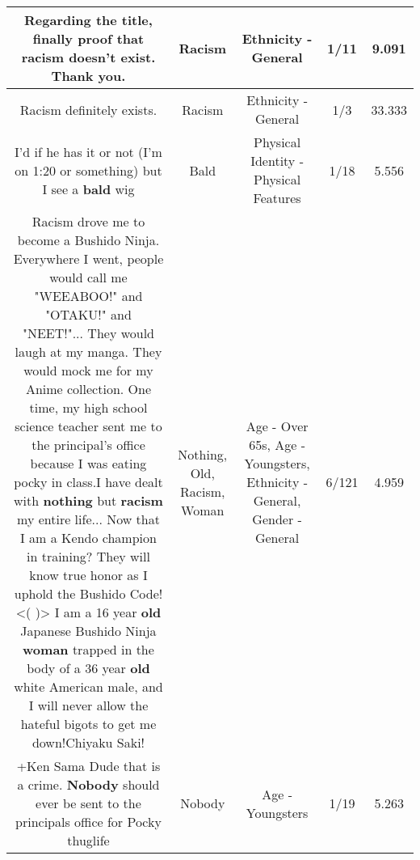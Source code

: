 \documentclass[11pt]{article}
\newlength\mylength
\begin{document}
\begin{center}
\begin{longtable}{|C{.65\mylength}|C{.30\mylength}|C{.12\mylength}|C{.12\mylength}|C{.12\mylength}|}
  \small Regarding the title, finally proof that \textbf{racism} doesn't exist. Thank you.\normalsize   & Racism & Ethnicity - General & 1/11 & 9.091 \\  \hline
  \small Racism definitely exists.\normalsize   & Racism & Ethnicity - General & 1/3 & 33.333 \\  \hline
  \small I'd if he has it or not (I'm on 1:20 or something) but I see a \textbf{bald} wig\normalsize   & Bald & Physical Identity - Physical Features & 1/18 & 5.556 \\  \hline
  \small Racism drove me to become a Bushido Ninja. Everywhere I went, people would call me "WEEABOO!" and "OTAKU!" and "NEET!"... They would laugh at my manga. They would mock me for my Anime collection. One time, my high school science teacher sent me to the principal's office because I was eating pocky in class.I have dealt with \textbf{nothing} but \textbf{racism} my entire life... Now that I am a Kendo champion in training? They will know true honor as I uphold the Bushido Code!<(   )> I am a 16 year \textbf{old} Japanese Bushido Ninja \textbf{woman} trapped in the body of a 36 year \textbf{old} white American male, and I will never allow the hateful bigots to get me down!Chiyaku Saki!\normalsize   & Nothing, Old, Racism, Woman & Age - Over 65s, Age - Youngsters, Ethnicity - General, Gender - General & 6/121 & 4.959 \\  \hline
  \small +Ken Sama Dude that is a crime. \textbf{Nobody} should ever be sent to the principals office for Pocky thuglife\normalsize   & Nobody & Age - Youngsters & 1/19 & 5.263 \\  \hline
  
\end{longtable}
\end{center}
\end{document}

